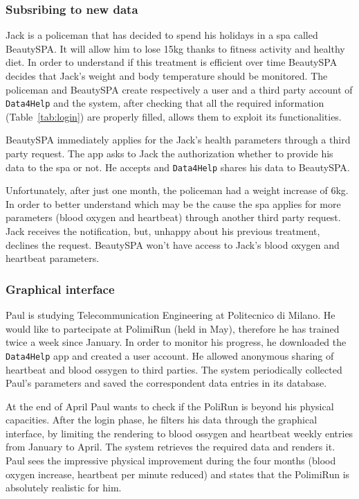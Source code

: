     \subsubsection{Subsribing to new data}

      Jack is a policeman that has decided to spend his holidays in a spa called BeautySPA. It will allow him to lose 15kg thanks to fitness activity and healthy diet. In order to understand if this treatment is efficient over time BeautySPA decides that Jack's weight and body temperature should be monitored. The policeman and BeautySPA create respectively a user and a third party account of \texttt{Data4Help} and the system, after checking that all the required information (Table~\ref{tab:login}) are properly filled, allows them to exploit its functionalities.

      BeautySPA immediately applies for the Jack's health parameters through a third party request. The app asks to Jack the authorization whether to provide his data to the spa or not. He accepts and \texttt{Data4Help} shares his data to BeautySPA.

      Unfortunately, after just one month, the policeman had a weight increase of 6kg. In order to better understand which may be the cause the spa applies for more parameters (blood oxygen and heartbeat) through another third party request. Jack receives the notification, but, unhappy about his previous treatment, declines the request. BeautySPA won't have access to Jack's blood oxygen and heartbeat parameters.

    \subsubsection{Graphical interface}

      Paul is studying Telecommunication Engineering at Politecnico di Milano. He would like to partecipate at PolimiRun (held in May), therefore he has trained twice a week since January. In order to monitor his progress, he downloaded the \texttt{Data4Help} app and created a user account. He allowed anonymous sharing of heartbeat and blood ossygen to third parties. The system periodically collected Paul's parameters and saved the correspondent data entries in its database.

      At the end of April Paul wants to check if the PoliRun is beyond his physical capacities. After the login phase, he filters his data through the graphical interface, by limiting the rendering to blood ossygen and heartbeat weekly entries from January to April. The system retrieves the required data and renders it. Paul sees the impressive physical improvement during the four months (blood oxygen increase, heartbeat per minute reduced) and states that the PolimiRun is absolutely realistic for him.

